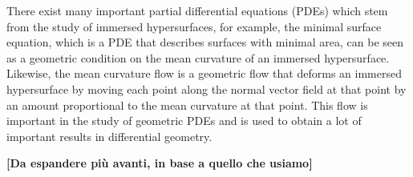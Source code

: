 

There exist many important partial differential equations (PDEs) which stem from the study of immersed hypersurfaces, for example, the minimal surface equation, which is a PDE that describes surfaces with minimal area, can be seen as a geometric condition on the mean curvature of an immersed hypersurface. Likewise, the mean curvature flow is a geometric flow that deforms an immersed hypersurface by moving each point along the normal vector field at that point by an amount proportional to the mean curvature at that point. This flow is important in the study of geometric PDEs and is used to obtain a lot of important results in differential geometry.







{\vspace{10pt}\LARGE \bf [Da espandere più avanti, in base a quello che usiamo\LARGE]}


